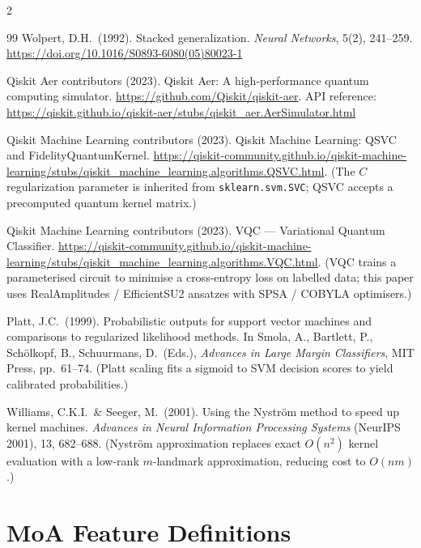 \documentclass[10pt,twocolumn]{article}
\begin{document}
{\begin{multicols}{2}
\begin{thebibliography}{99}
Wolpert, D.H.\ (1992).
Stacked generalization.
\textit{Neural Networks}, 5(2), 241--259.
\url{https://doi.org/10.1016/S0893-6080(05)80023-1}

Qiskit Aer contributors (2023).
Qiskit Aer: A high-performance quantum computing simulator.
\url{https://github.com/Qiskit/qiskit-aer}.
API reference: \url{https://qiskit.github.io/qiskit-aer/stubs/qiskit_aer.AerSimulator.html}

Qiskit Machine Learning contributors (2023).
Qiskit Machine Learning: QSVC and FidelityQuantumKernel.
\url{https://qiskit-community.github.io/qiskit-machine-learning/stubs/qiskit_machine_learning.algorithms.QSVC.html}.
(The $C$ regularization parameter is inherited from \texttt{sklearn.svm.SVC}; QSVC accepts a precomputed quantum kernel matrix.)

Qiskit Machine Learning contributors (2023).
VQC --- Variational Quantum Classifier.
\url{https://qiskit-community.github.io/qiskit-machine-learning/stubs/qiskit_machine_learning.algorithms.VQC.html}.
(VQC trains a parameterised circuit to minimise a cross-entropy loss on labelled data; this paper uses RealAmplitudes / EfficientSU2 ansatzes with SPSA / COBYLA optimisers.)

Platt, J.C.\ (1999).
Probabilistic outputs for support vector machines and comparisons to regularized likelihood methods.
In Smola, A., Bartlett, P., Sch\"{o}lkopf, B., Schuurmans, D.\ (Eds.),
\textit{Advances in Large Margin Classifiers}, MIT Press, pp.\ 61--74.
(Platt scaling fits a sigmoid to SVM decision scores to yield calibrated probabilities.)

Williams, C.K.I.\ \& Seeger, M.\ (2001).
Using the Nystr\"{o}m method to speed up kernel machines.
\textit{Advances in Neural Information Processing Systems} (NeurIPS 2001), 13, 682--688.
(Nystr\"{o}m approximation replaces exact $O(n^2)$ kernel evaluation with a low-rank $m$-landmark approximation, reducing cost to $O(nm)$.)

\end{thebibliography}
\end{multicols}
}

\appendix

\section{MoA Feature Definitions}\label{app:moa_features}
\end{document}
